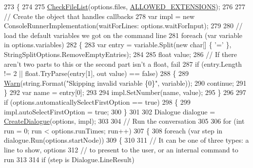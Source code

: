 \begin{DoxyCode}
273         \{
274 
275             \hyperlink{a00189_ad77564b25725a771f0fd4da430582e6f}{CheckFileList}(options.files, \hyperlink{a00189_a0979de7ea02c8c0375b8220a12e6575e}{ALLOWED\_EXTENSIONS});
276 
277             \textcolor{comment}{// Create the object that handles callbacks}
278             var impl = \textcolor{keyword}{new} ConsoleRunnerImplementation(waitForLines: options.waitForInput);
279 
280             \textcolor{comment}{// load the default variables we got on the command line}
281             \textcolor{keywordflow}{foreach} (var variable \textcolor{keywordflow}{in} options.variables)
282             \{
283                 var entry = variable.Split(\textcolor{keyword}{new} \textcolor{keywordtype}{char}[] \{ \textcolor{charliteral}{'='} \}, StringSplitOptions.RemoveEmptyEntries);
284 
285                 \textcolor{keywordtype}{float} value;
286                 \textcolor{comment}{// If there aren't two parts to this or the second part isn't a float, fail}
287                 \textcolor{keywordflow}{if} (entry.Length != 2 || \textcolor{keywordtype}{float}.TryParse(entry[1], out value) == \textcolor{keyword}{false})
288                 \{
289                     \hyperlink{a00189_a979bb6f049b6c5294f745a19e24ddd9d}{Warn}(\textcolor{keywordtype}{string}.Format(\textcolor{stringliteral}{"Skipping invalid variable \{0\}"}, variable));
290                     \textcolor{keywordflow}{continue};
291                 \}
292                 var name = entry[0];
293 
294                 impl.SetNumber(name, value);
295             \}
296 
297             \textcolor{keywordflow}{if} (options.automaticallySelectFirstOption == \textcolor{keyword}{true})
298             \{
299                 impl.autoSelectFirstOption = \textcolor{keyword}{true};
300             \}
301 
302             Dialogue dialogue = \hyperlink{a00189_aab244361a510cee18ad2f636d110e0d5}{CreateDialogue}(options, impl);
303 
304             \textcolor{comment}{// Run the conversation}
305 
306             \textcolor{keywordflow}{for} (\textcolor{keywordtype}{int} run = 0; run < options.runTimes; run++)
307             \{
308                 \textcolor{keywordflow}{foreach} (var step \textcolor{keywordflow}{in} dialogue.Run(options.startNode))
309                 \{
310 
311                     \textcolor{comment}{// It can be one of three types: a line to show, options}
312                     \textcolor{comment}{// to present to the user, or an internal command to run}
313 
314                     \textcolor{keywordflow}{if} (step is Dialogue.LineResult)

\end{DoxyCode}
